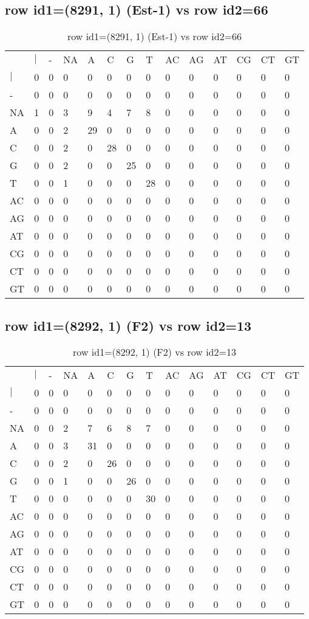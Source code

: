 \subsection{row id1=(8291, 1) (Est-1) vs row id2=66}
\begin{center}
\begin{longtable}{|l|l|l|l|l|l|l|l|l|l|l|l|l|l|}
\caption{row id1=(8291, 1) (Est-1) vs row id2=66} \label{table_dm266}\\
\hline
\\
\hline
&$|$&-&NA&A&C&G&T&AC&AG&AT&CG&CT&GT\\
$|$&0&0&0&0&0&0&0&0&0&0&0&0&0\\
-&0&0&0&0&0&0&0&0&0&0&0&0&0\\
NA&1&0&3&9&4&7&8&0&0&0&0&0&0\\
A&0&0&2&29&0&0&0&0&0&0&0&0&0\\
C&0&0&2&0&28&0&0&0&0&0&0&0&0\\
G&0&0&2&0&0&25&0&0&0&0&0&0&0\\
T&0&0&1&0&0&0&28&0&0&0&0&0&0\\
AC&0&0&0&0&0&0&0&0&0&0&0&0&0\\
AG&0&0&0&0&0&0&0&0&0&0&0&0&0\\
AT&0&0&0&0&0&0&0&0&0&0&0&0&0\\
CG&0&0&0&0&0&0&0&0&0&0&0&0&0\\
CT&0&0&0&0&0&0&0&0&0&0&0&0&0\\
GT&0&0&0&0&0&0&0&0&0&0&0&0&0\\
\hline
\end{longtable}
\end{center}

\subsection{row id1=(8292, 1) (F2) vs row id2=13}
\begin{center}
\begin{longtable}{|l|l|l|l|l|l|l|l|l|l|l|l|l|l|}
\caption{row id1=(8292, 1) (F2) vs row id2=13} \label{table_dm268}\\
\hline
\\
\hline
&$|$&-&NA&A&C&G&T&AC&AG&AT&CG&CT&GT\\
$|$&0&0&0&0&0&0&0&0&0&0&0&0&0\\
-&0&0&0&0&0&0&0&0&0&0&0&0&0\\
NA&0&0&2&7&6&8&7&0&0&0&0&0&0\\
A&0&0&3&31&0&0&0&0&0&0&0&0&0\\
C&0&0&2&0&26&0&0&0&0&0&0&0&0\\
G&0&0&1&0&0&26&0&0&0&0&0&0&0\\
T&0&0&0&0&0&0&30&0&0&0&0&0&0\\
AC&0&0&0&0&0&0&0&0&0&0&0&0&0\\
AG&0&0&0&0&0&0&0&0&0&0&0&0&0\\
AT&0&0&0&0&0&0&0&0&0&0&0&0&0\\
CG&0&0&0&0&0&0&0&0&0&0&0&0&0\\
CT&0&0&0&0&0&0&0&0&0&0&0&0&0\\
GT&0&0&0&0&0&0&0&0&0&0&0&0&0\\
\hline
\end{longtable}
\end{center}

